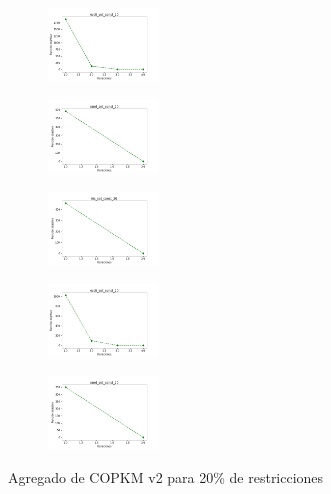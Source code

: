 \begin{figure}[H]
\begin{subfigure}
    \end{subfigure}
    \hfill
    \begin{subfigure}
        \centering
        \includegraphics[width=0.32\textwidth]{img/copkm2/ecoli_set_const_20_49258669_cost.png}
    \end{subfigure}
    \hfill
    \begin{subfigure}
        \centering
        \includegraphics[width=0.32\textwidth]{img/copkm2/rand_set_const_20_49258669_cost.png}
    \end{subfigure}
    \hfill
    \begin{subfigure}
        \centering
        \includegraphics[width=0.32\textwidth]{img/copkm2/iris_set_const_20_3773969821_cost.png}
    \end{subfigure}
    \hfill
    \begin{subfigure}
        \centering
        \includegraphics[width=0.32\textwidth]{img/copkm2/ecoli_set_const_20_3773969821_cost.png}
    \end{subfigure}
    \hfill
    \begin{subfigure}
        \centering
        \includegraphics[width=0.32\textwidth]{img/copkm2/rand_set_const_20_3773969821_cost.png}
    \end{subfigure}
    \caption{Agregado de COPKM v2 para 20\% de restricciones}
\end{figure}

\newpage